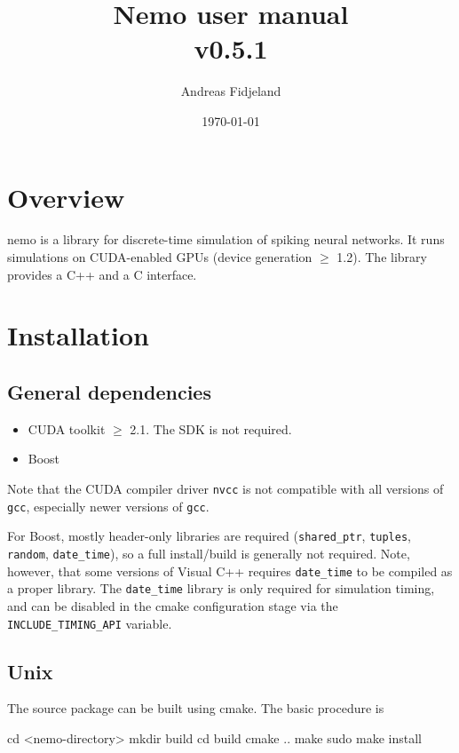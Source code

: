 \documentclass[a4paper]{article}
\title{Nemo user manual\\v0.5.1}
\author{Andreas Fidjeland}
\date{\today}
\newcommand{\code}[1]{\texttt{#1}}
\newcommand{\command}[1]{\texttt{#1}}
\newcommand{\library}[1]{\texttt{#1}}
\begin{document}
\maketitle

\section{Overview}

nemo is a library for discrete-time simulation of spiking neural networks.
It runs simulations on CUDA-enabled GPUs (device generation $\geq$ 1.2).
The library provides a C++ and a C interface. 

\section{Installation}

\subsection{General dependencies}

\begin{itemize}
	\item CUDA toolkit $\geq$ 2.1. The SDK is not required.
	\item Boost
\end{itemize}

Note that the CUDA compiler driver \command{nvcc} is not compatible with all versions
of \command{gcc}, especially newer versions of \command{gcc}.

For Boost, mostly header-only libraries are required (\library{shared\_ptr}, \library{tuples},
\library{random}, \library{date\_time}), so a full install/build is generally not required. 
Note, however, that some versions of Visual C++ requires \library{date\_time} to be compiled as
a proper library. 
The \library{date\_time} library is only required for simulation timing,
	and can be disabled in the cmake configuration stage via the \code{INCLUDE\_TIMING\_API} variable.

\subsection{Unix}

The source package can be built using cmake. The basic procedure is 

\begin{shell}
cd <nemo-directory>
mkdir build
cd build
cmake ..
make
sudo make install
\end{shell}
\end{document}
